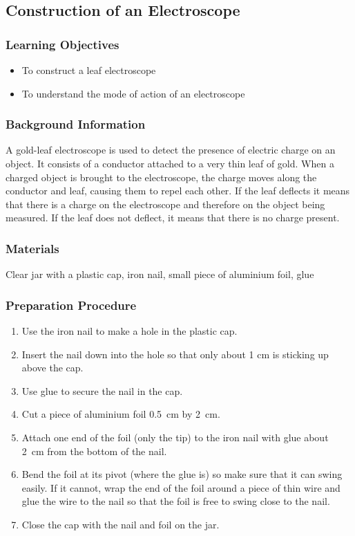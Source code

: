 \subsection{Construction of an Electroscope}

\subsubsection*{Learning Objectives}
\begin{itemize}
\item{To construct a leaf electroscope} 
\item{To understand the mode of action of an electroscope} 
\end{itemize}

\subsubsection*{Background Information}
A gold-leaf electroscope is used to detect the presence of electric charge on an object. It consists of a conductor attached to a very thin leaf of gold. When a charged object is brought to the electroscope, the charge moves along the conductor and leaf, causing them to repel each other. If the leaf deflects it means that there is a charge on the electroscope and therefore on the object being measured. If the leaf does not deflect, it means that there is no charge present. 

\subsubsection*{Materials}
Clear jar with a plastic cap, iron nail, small piece of aluminium foil, glue


\subsubsection*{Preparation Procedure}
\begin{enumerate}
\item{Use the iron nail to make a hole in the plastic cap.} 
\item{Insert the nail down into the hole so that only about 1 cm is sticking up above the cap.} 
\item{Use glue to secure the nail in the cap.} 
\item{Cut a piece of aluminium foil 0.5~cm by 2~cm.} 
\item{Attach one end of the foil (only the tip) to the iron nail with glue about 2~cm from the bottom of the nail.} 
\item{Bend the foil at its pivot (where the glue is) so make sure that it can swing easily. If it cannot, wrap the end of the foil around a piece of thin wire and glue the wire to the nail so that the foil is free to swing close to the nail.} 
\item{Close the cap with the nail and foil on the jar.} 
\end{enumerate}

